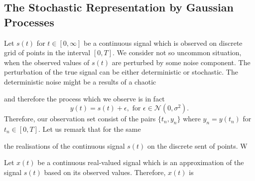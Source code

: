 \subsection{The Stochastic Representation by Gaussian Processes}
Let $s(t)$ for $t\in [0,\infty]$ be a continuous signal which is observed on discrete grid of points in the interval $[0,T]$. We consider not so uncommon situation, when the observed values of $s(t)$ are perturbed by some noise component. The perturbation of the true signal can be either deterministic or stochastic. The deterministic noise might be a results of  a chaotic 


 and therefore the process which we observe is in fact
\begin{equation}\label{eq:signal_noisy_y}
y(t) = s(t) + \epsilon, \text{ for } \epsilon \in \mathcal{N}(0, \sigma^2).
\end{equation}
Therefore, our observation set consist of the pairs $\big\{t_n,y_n\big\}$ where $y_n = y(t_n)$ for $t_n \in [0,T]$. Let us remark that for the same

 the realisations of the continuous signal $s(t)$ on the discrete sent of points. W


Let $x(t)$ be a continuous real-valued signal which is an approximation of the signal $s(t)$ based on its observed values. Therefore, $x(t)$ is  

